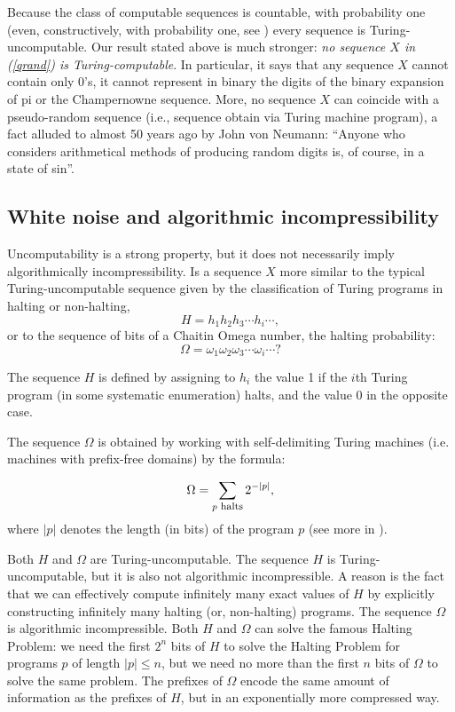 \documentclass[pra,amsfonts,preprint,showkeys]{revtex4}
\begin{document}
Because the class of computable sequences is countable, with probability one (even, constructively, with probability one, see \cite{calude:02}) every sequence is Turing-uncomputable. Our result stated above is much stronger: {\it no  sequence $X$  in (\ref{qrand})  is Turing-computable}. In particular, it says that any sequence $X$ cannot contain only 0's, it  cannot represent in binary the digits of the binary expansion of pi or the Champernowne sequence. More,  no  sequence $X$  can coincide with a pseudo-random sequence
(i.e., sequence obtain via  Turing machine program), a   fact alluded  to almost 50 years ago by  John von Neumann: ``Anyone who considers arithmetical methods of producing random digits is, of course, in a state of sin''.

\subsection{White noise and algorithmic incompressibility}


Uncomputability is a strong property, but it does not necessarily imply  algorithmically incompressibility. Is a sequence $X$
more similar to the typical Turing-uncomputable sequence  given by
the classification of Turing programs in halting or non-halting, \begin{equation}
\label{hseq}
H =h_1h_2h_3\cdots h_i \cdots,
\end{equation}
or to the sequence of bits of a Chaitin Omega number, the halting probability:
\begin{equation}
\label{omega}
\Omega =\omega_1 \omega_2 \omega_3\cdots \omega_i \cdots ?
\end{equation}

The sequence $H$ is defined by assigning to $h_{i}$ the value 1 if the $i$th Turing program (in some
systematic enumeration) halts, and the value 0 in the opposite case.

The sequence $\Omega$ is obtained by working with self-delimiting Turing machines (i.e. machines with prefix-free domains) by the formula:

\[\Omega = \sum_{p {\footnotesize \mbox{   halts}}} 2^{-|p|},\]
where $|p|$ denotes the length (in bits) of the program $p$ (see more in \cite{calude:02}).

Both $H$ and $\Omega$ are Turing-uncomputable. The sequence $H$ is  Turing-uncomputable, but it is also not
algorithmic incompressible. A reason is the fact that we can
effectively  compute   infinitely many exact values of $H$ by  explicitly
constructing infinitely many halting (or, non-halting) programs.
The sequence $\Omega$ is algorithmic incompressible. Both  $H$ and $\Omega$ can solve the famous Halting Problem: we need the first $2^{n}$ bits of  $H$ to solve the Halting Problem for programs $p$ of length
$|p| \le n$, but we need no more than the first  $n$ bits of $\Omega$ to solve the same problem.
The prefixes of $\Omega$ encode the same amount of information as the prefixes of $H$, but in an exponentially more compressed way.
\end{document}
